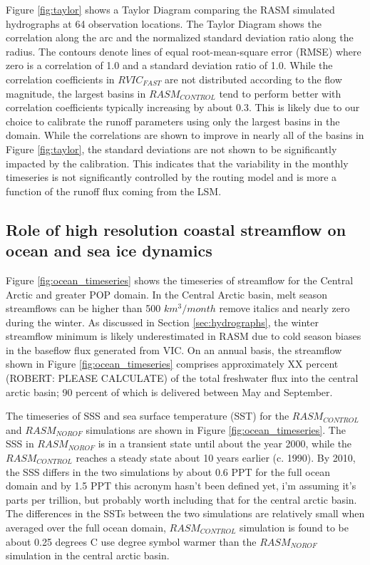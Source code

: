\documentclass[jgrga, draft]{agutex}
\begin{document}
\begin{article}
Figure \ref{fig:taylor} shows a Taylor Diagram comparing the RASM simulated hydrographs at 64 observation locations.
The Taylor Diagram shows the correlation along the arc and the normalized standard deviation ratio along the radius.
The contours denote lines of equal root-mean-square error (RMSE) where zero is a correlation of 1.0 and a standard deviation ratio of 1.0.
While the correlation coefficients in $RVIC_{FAST}$ are not distributed according to the flow magnitude, the largest basins in $RASM_{CONTROL}$ tend to perform better with correlation coefficients typically increasing by about 0.3.
This is likely due to our choice to calibrate the runoff parameters using only the largest basins in the domain.
While the correlations are shown to improve in nearly all of the basins in Figure \ref{fig:taylor}, the standard deviations are not shown to be significantly impacted by the calibration.
This indicates that the variability in the monthly timeseries is not significantly controlled by the routing model and is more a function of the runoff flux coming from the LSM.

\subsection{Role of high resolution coastal streamflow on ocean and sea ice dynamics}
\label{sec:ocean}

Figure \ref{fig:ocean_timeseries} shows the timeseries of streamflow for the Central Arctic and greater POP domain.
In the Central Arctic basin, melt season streamflows can be higher than 500 $km^3/month$ {remove italics} and nearly zero during the winter.
As discussed in Section \ref{sec:hydrographs}, the winter streamflow minimum is likely underestimated in RASM due to cold season biases in the baseflow flux generated from VIC.
On an annual basis, the streamflow shown in Figure \ref{fig:ocean_timeseries} comprises approximately XX percent (ROBERT: PLEASE CALCULATE) of the total freshwater flux into the central arctic basin; 90 percent of which is delivered between May and September.

The timeseries of SSS and sea surface temperature (SST) for the $RASM_{CONTROL}$ and $RASM_{NOROF}$ simulations are shown in Figure \ref{fig:ocean_timeseries}.
The SSS in $RASM_{NOROF}$ is in a transient state until about the year 2000, while the $RASM_{CONTROL}$ reaches a steady state about 10 years earlier (c. 1990).
By 2010, the SSS differs in the two simulations by about 0.6 PPT for the full ocean domain and by 1.5 PPT {this acronym hasn't been defined yet, i'm assuming it's parts per trillion, but probably worth including that} for the central arctic basin.
The differences in the SSTs between the two simulations are relatively small when averaged over the full ocean domain, $RASM_{CONTROL}$ simulation is found to be about 0.25 degrees C {use degree symbol} warmer than the $RASM_{NOROF}$ simulation in the central arctic basin.


\end{article}
\end{document}
